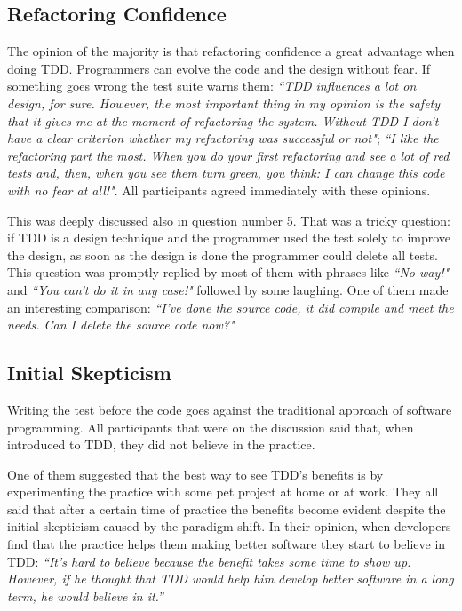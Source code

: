 \subsection{Refactoring Confidence}

The opinion of the majority is that refactoring confidence a great advantage
when doing TDD. Programmers can evolve the code and the design without fear. 
If something goes
wrong the test suite warns them: \textit{``TDD influences a lot on design,
for sure. However, the most important thing in my opinion is the safety that it
gives me at the moment of refactoring the system. Without TDD I don't have a
clear criterion whether my refactoring was successful or not"};
\textit{``I like the refactoring part the most.
When you do your first refactoring and see a lot of red tests and, then, when
you see them turn green, you think: I can change this code with no fear at
all!"}.
All participants agreed immediately with these opinions.

This was deeply discussed also in question number 5. That was a tricky question:
if TDD is a design technique and the programmer used the test solely to improve
the design, as soon as the design is done the programmer could delete all tests.
This question was promptly replied by most of them with phrases like 
\textit{``No way!"} and \textit{``You can't do it in any case!"} followed 
by some laughing. One of them made an interesting comparison: 
\textit{``I've done the source code, it did compile and meet the needs. Can I
delete the source code now?"}

\subsection{Initial Skepticism}

Writing the test before the code goes against the traditional approach of
software programming. 
All participants that were on the discussion said that, when introduced to TDD,
they did not believe in the practice.

One of them suggested that the best way to see TDD's benefits is by
experimenting the practice with some pet project at home or at work.
They all said that after a certain time of practice the benefits become evident
despite the initial skepticism caused by the paradigm shift.
In their opinion, when developers find that the practice helps them making
better software they start to believe in TDD: \textit{``It's hard to believe
because the benefit takes some time to show up. However, if he thought that TDD
would help him develop better software in a long term, he would believe in it.''}

